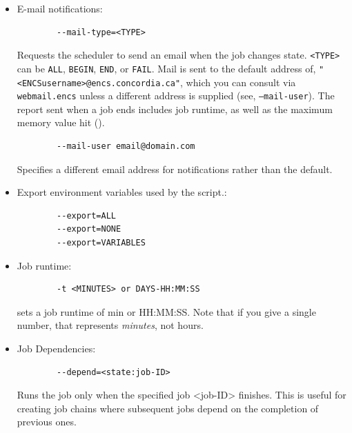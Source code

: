 \begin{itemize}
	\item E-mail notifications:
	\begin{verbatim}
		--mail-type=<TYPE>
	\end{verbatim}
	Requests the scheduler to send an email when the job changes state.
	\texttt{<TYPE>} can be \texttt{ALL}, \texttt{BEGIN}, \texttt{END}, or \texttt{FAIL}.
	Mail is sent to the default address of, \texttt{"<ENCSusername>@encs.concordia.ca"}, 
	which you can consult via \texttt{webmail.encs} unless a different address is supplied 
	(see, \texttt{--mail-user}).
	The report sent when a job ends includes job 
	runtime, as well as the maximum memory value hit (). 
	\begin{verbatim}
		--mail-user email@domain.com
	\end{verbatim}
	Specifies a different email address for notifications rather than the default.

	\item Export environment variables used by the script.:
	\begin{verbatim}
		--export=ALL
		--export=NONE
		--export=VARIABLES
	\end{verbatim}

	\item Job runtime:
	\begin{verbatim}
		-t <MINUTES> or DAYS-HH:MM:SS
	\end{verbatim} 
	sets a job runtime of min or HH:MM:SS. Note that if you give a single number, that represents \emph{minutes}, not hours. 

	\item Job Dependencies:
	\begin{verbatim}
		--depend=<state:job-ID>
	\end{verbatim} 
	Runs the job only when the specified job <job-ID> finishes. This is useful for creating job chains where 
	subsequent jobs depend on the completion of previous ones.
\end{itemize}

